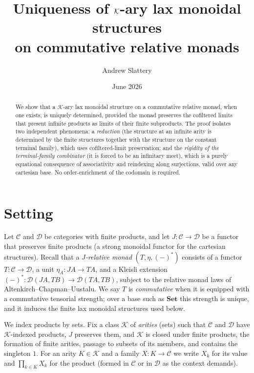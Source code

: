 \documentclass{article}
\title{Uniqueness of $\K$-ary lax monoidal structures\\ on commutative relative monads}
\author{Andrew Slattery}
\date{June 2026}
\newcommand{\C}{\mathcal{C}}
\newcommand{\D}{\mathcal{D}}
\newcommand{\K}{\mathcal{K}}
\newcommand{\Set}{\mathbf{Set}}
\begin{document}
\maketitle

\begin{abstract}
We show that a $\K$-ary lax monoidal structure on a commutative relative monad,
when one exists, is uniquely determined, provided the monad preserves the
cofiltered limits that present infinite products as limits of their finite
subproducts. The proof isolates two independent phenomena: a \emph{reduction}
(the structure at an infinite arity is determined by the finite structures
together with the structure on the constant terminal family), which uses
cofiltered-limit preservation; and the \emph{rigidity of the terminal-family
combinator} (it is forced to be an infinitary meet), which is a purely
equational consequence of associativity and reindexing along surjections, valid
over any cartesian base. No order-enrichment of the codomain is required.
\end{abstract}

\section{Setting}

Let $\C$ and $\D$ be categories with finite products, and let
$J\colon\C\to\D$ be a functor that preserves finite products (a strong monoidal
functor for the cartesian structures). Recall that a \emph{$J$-relative monad}
$(T,\eta,(-)^{*})$ consists of a functor $T\colon\C\to\D$, a unit
$\eta_A\colon JA\to TA$, and a Kleisli extension
$(-)^{*}\colon\D(JA,TB)\to\D(TA,TB)$, subject to the relative monad laws of
Altenkirch--Chapman--Uustalu. We say $T$ is \emph{commutative} when it is
equipped with a commutative tensorial strength; over a base such as $\Set$ this
strength is unique, and it induces the finite lax monoidal structures used
below.

We index products by sets. Fix a class $\K$ of \emph{arities} (sets) such that
$\C$ and $\D$ have $\K$-indexed products, $J$ preserves them, and $\K$ is closed
under finite products, the formation of finite arities, passage to subsets of
its members, and contains the singleton $1$. For an arity $K\in\K$ and a family
$X\colon K\to\C$ we write $X_k$ for its value and $\prod_{k\in K}X_k$ for the
product (formed in $\C$ or in $\D$ as the context demands).
\end{document}
